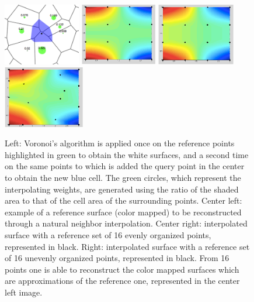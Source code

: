 \begin{figure}[!ht]
\begin{center} \includegraphics[height=27mm]{forqgis/natneiweights.png} \hspace{0.05cm}\includegraphics[height=27mm]{forqgis/natneiref.pdf}
\hspace{0.05cm}\includegraphics[height=27mm]{forqgis/natneireco1.pdf} \hspace{0.05cm}\includegraphics[height=27mm]{forqgis/natneireco2.pdf}
 \end{center}
\caption{\small Left: Voronoi's algorithm is applied once on the reference points highlighted in green to obtain the white surfaces, and a second time on the same points to which is added the query point in the center to obtain the new blue cell. The green circles, which represent the interpolating weights, are generated using the ratio of the shaded area to that of the cell area of the surrounding points. Center left: example of a reference surface (color mapped) to be reconstructed through a natural neighbor interpolation. Center right: interpolated surface with a reference set of 16 evenly organized points, represented in black. Right: interpolated surface with a reference set of 16 unevenly organized points, represented in black. From 16 points one is able to reconstruct the color mapped surfaces which are approximations of the reference one, represented in the center left image. }
\label{fig:natneighb}
\end{figure}


